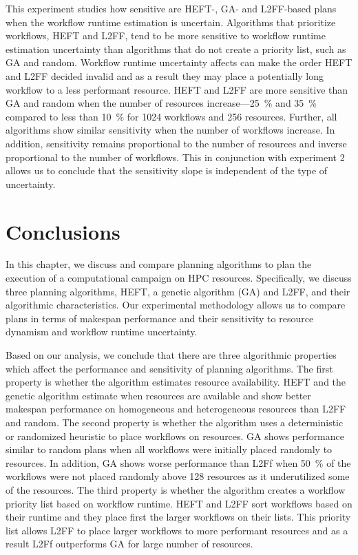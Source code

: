 This experiment studies how sensitive are HEFT-, GA- and L2FF-based plans when
the workflow runtime estimation is uncertain. Algorithms that prioritize
workflows, HEFT and L2FF, tend to be more sensitive to workflow runtime
estimation uncertainty than algorithms that do not create a priority list,
such as GA and random. Workflow runtime uncertainty affects can make the order
HEFT and L2FF decided invalid and as a result they may place a potentially
long workflow to a less performant resource. HEFT and L2FF are more sensitive
than GA and random when the number of resources increase---25~\% and 35~\%
compared to less than 10~\% for 1024 workflows and 256 resources. Further, all
algorithms show similar sensitivity when the number of workflows increase. In
addition, sensitivity remains proportional to the number of resources and
inverse proportional to the number of workflows. This in conjunction with
experiment 2 allows us to conclude that the sensitivity slope is independent
of the type of uncertainty.

\section{Conclusions}
\label{sec:cf_algo_sel}
In this chapter, we discuss and compare planning algorithms to plan the
execution of a computational campaign on HPC resources. Specifically, we
discuss three planning algorithms, HEFT, a genetic algorithm (GA) and L2FF,
and their algorithmic characteristics. Our experimental methodology allows us
to compare plans in terms of makespan performance and their sensitivity to
resource dynamism and workflow runtime uncertainty.

Based on our analysis, we conclude that there are three algorithmic properties
which affect the performance and sensitivity of planning algorithms. The first
property is whether the algorithm estimates resource availability. HEFT and
the genetic algorithm estimate when resources are available and show better
makespan performance on homogeneous and heterogeneous resources than L2FF and
random. The second property is whether the algorithm uses a deterministic or
randomized heuristic to place workflows on resources. GA shows performance
similar to random plans when all workflows were initially placed randomly to
resources. In addition, GA shows worse performance than L2Ff when 50~\% of the
workflows were not placed randomly above 128 resources as it underutilized
some of the resources. The third property is whether the algorithm creates a
workflow priority list based on workflow runtime. HEFT and L2FF sort workflows
based on their runtime and they place first the larger workflows on their
lists. This priority list allows L2FF to place larger workflows to more
performant resources and as a result L2Ff outperforms GA for large number of
resources.

